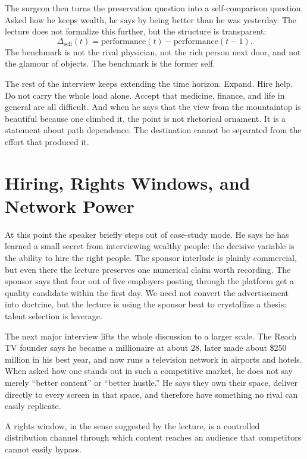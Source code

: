 The surgeon then turns the preservation question into a self-comparison question. Asked how he keeps wealth, he says by being better than he was yesterday. The lecture does not formalize this further, but the structure is transparent:
\begin{equation}
\Delta_{\text{self}}(t) = \text{performance}(t) - \text{performance}(t-1).
\end{equation}
The benchmark is not the rival physician, not the rich person next door, and not the glamour of objects. The benchmark is the former self.

The rest of the interview keeps extending the time horizon. Expand. Hire help. Do not carry the whole load alone. Accept that medicine, finance, and life in general are all difficult. And when he says that the view from the mountaintop is beautiful because one climbed it, the point is not rhetorical ornament. It is a statement about path dependence. The destination cannot be separated from the effort that produced it.

\section{Hiring, Rights Windows, and Network Power}

At this point the speaker briefly steps out of case-study mode. He says he has learned a small secret from interviewing wealthy people: the decisive variable is the ability to hire the right people. The sponsor interlude is plainly commercial, but even there the lecture preserves one numerical claim worth recording. The sponsor says that four out of five employers posting through the platform get a quality candidate within the first day. We need not convert the advertisement into doctrine, but the lecture is using the sponsor beat to crystallize a thesis: talent selection is leverage.

The next major interview lifts the whole discussion to a larger scale. The Reach TV founder says he became a millionaire at about $28$, later made about \$250 million in his best year, and now runs a television network in airports and hotels. When asked how one stands out in such a competitive market, he does not say merely ``better content'' or ``better hustle.'' He says they own their space, deliver directly to every screen in that space, and therefore have something no rival can easily replicate.

\begin{definition}
A rights window, in the sense suggested by the lecture, is a controlled distribution channel through which content reaches an audience that competitors cannot easily bypass.
\end{definition}

